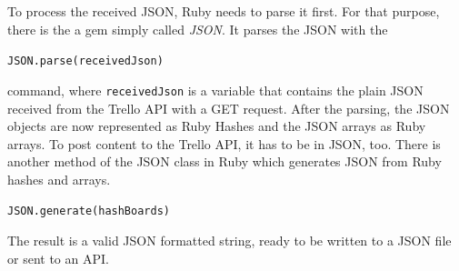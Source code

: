 To process the received JSON, Ruby needs to parse it first. For that purpose, there is the a gem simply called \emph{JSON}. It parses the JSON with the 

\begin{center}
\lstinline{JSON.parse(receivedJson)} 
\end{center}
command, where \lstinline{receivedJson} is a variable that contains the plain JSON received from the Trello API with a GET request. After the parsing, the JSON objects are now represented as Ruby Hashes and the JSON arrays as Ruby arrays. To post content to the Trello API, it has to be in JSON, too. There is another method of the JSON class in Ruby which generates JSON from Ruby hashes and arrays. 

\begin{center}
\lstinline{JSON.generate(hashBoards)} 
\end{center}

The result is a valid JSON formatted string, ready to be written to a JSON file or sent to an API.